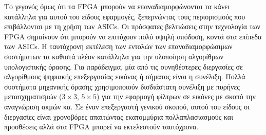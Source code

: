 Το γεγονός όμως ότι τα FPGA μπορούν να επαναδιαμορφώνονται τα κάνει κατάλληλα για αυτού του είδους εφαρμογές, ξεπερνώντας τους περιορισμούς που επιβάλλονται με τη χρήση των ASICs. Οι πρόσφατες βελτιώσεις στην τεχνολογία των FPGA σημαίνουν ότι μπορούν να επιτύχουν πολύ υψηλή απόδοση, κοντά στα επίπεδα των ASICs. Η ταυτόχρονη εκτέλεση των εντολών των επαναδιαμορφώσιμων συστήματων τα καθιστά πλέον κατάλληλα για την υλοποίηση αλγορίθμων υπολογιστικής όρασης. Για παράδειγμα, μία από τις συνηθέστερες διεργασίες σε αλγορίθμους ψηφιακής επεξεργασίας εικόνας ή σήματος είναι η συνέλιξη. Πολλά συστήματα μηχανικής όρασης χρησιμοποιούν δισδιάστατη συνέλιξη με πυρήνες μετασχηματισμών ($3\times 3$, $5\times 5$) για την εφαρμογή φίλτρων σε εικόνες με σκοπό την αναγνώριση ακμών κα. Σε έναν επεξεργαστή γενικού σκοπού, αυτού του είδους οι διεργασίες είναι χρονοβόρες απαιτώντας εκατομμύρια πολλαπλασιασμούς και προσθέσεις αλλά στα FPGA μπορεί να εκτελεστούν ταυτόχρονα.


